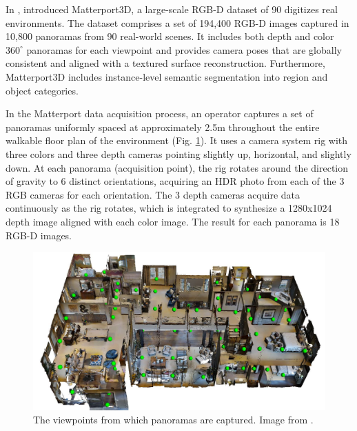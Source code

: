 In \citeyear{matterport}, \citeauthor{matterport} introduced Matterport3D, a large-scale RGB-D dataset of 90 digitizes real environments. The dataset comprises a set of 194,400 RGB-D images captured in 10,800 panoramas from 90 real-world scenes. It includes both depth and color $360^{\circ} $ panoramas for each viewpoint and provides camera poses that are globally consistent and aligned with a textured surface reconstruction. Furthermore, Matterport3D includes instance-level semantic segmentation into region and object categories.

In the Matterport data acquisition process, an operator captures
a set of panoramas uniformly spaced at approximately 2.5m
throughout the entire walkable floor plan of the environment (Fig. \ref{fig:matterport-panoramas}). It uses a camera system rig with three colors and three depth cameras pointing slightly up, horizontal, and slightly down. At each panorama (acquisition point), the rig rotates around the direction of gravity to
6 distinct orientations, acquiring an HDR photo from each of the 3 RGB cameras for each orientation. The 3 depth cameras acquire data continuously as the rig rotates, which is integrated to synthesize a 1280x1024 depth image aligned
with each color image. The result for each panorama is 18 RGB-D images. 

\begin{figure}[h!]
	\centering
	\includegraphics[width=\textwidth]{images/panoramas.pdf}
	\caption{The viewpoints from which panoramas are captured. Image from \cite{matterport}.}
	\label{fig:matterport-panoramas}
\end{figure}

